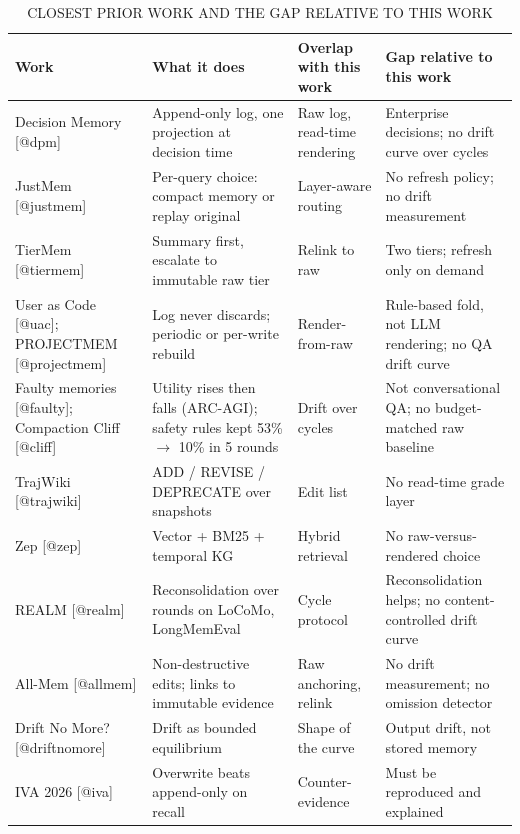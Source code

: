 \begin{table}[!htb]
\centering
\caption{CLOSEST PRIOR WORK AND THE GAP RELATIVE TO THIS WORK}
\footnotesize\renewcommand{\arraystretch}{1.18}
\begin{tabularx}{\textwidth}{|p{3.4cm}|p{4.6cm}|p{4.2cm}|X|}
\hline
\textbf{Work} & \textbf{What it does} & \textbf{Overlap with this work} & \textbf{Gap relative to this work} \\ \hline
Decision Memory [@dpm] & Append-only log, one projection at decision time & Raw log, read-time rendering & Enterprise decisions; no drift curve over cycles \\ \hline
JustMem [@justmem] & Per-query choice: compact memory or replay original & Layer-aware routing & No refresh policy; no drift measurement \\ \hline
TierMem [@tiermem] & Summary first, escalate to immutable raw tier & Relink to raw & Two tiers; refresh only on demand \\ \hline
User as Code [@uac]; PROJECTMEM [@projectmem] & Log never discards; periodic or per-write rebuild & Render-from-raw & Rule-based fold, not LLM rendering; no QA drift curve \\ \hline
Faulty memories [@faulty]; Compaction Cliff [@cliff] & Utility rises then falls (ARC-AGI); safety rules kept 53\% $\to$ 10\% in 5 rounds & Drift over cycles & Not conversational QA; no budget-matched raw baseline \\ \hline
TrajWiki [@trajwiki] & ADD / REVISE / DEPRECATE over snapshots & Edit list & No read-time grade layer \\ \hline
Zep [@zep] & Vector + BM25 + temporal KG & Hybrid retrieval & No raw-versus-rendered choice \\ \hline
REALM [@realm] & Reconsolidation over rounds on LoCoMo, LongMemEval & Cycle protocol & Reconsolidation helps; no content-controlled drift curve \\ \hline
All-Mem [@allmem] & Non-destructive edits; links to immutable evidence & Raw anchoring, relink & No drift measurement; no omission detector \\ \hline
Drift No More? [@driftnomore] & Drift as bounded equilibrium & Shape of the curve & Output drift, not stored memory \\ \hline
IVA 2026 [@iva] & Overwrite beats append-only on recall & Counter-evidence & Must be reproduced and explained \\ \hline
\end{tabularx}
\end{table}

